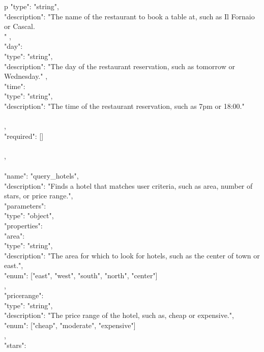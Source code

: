 \begin{table*}
\begin{tabular}{p\linewidth}
{{{{                    "type": "string",\\
                    "description": "The name of the restaurant to book a table at, such as Il Fornaio or Cascal.\\"
		        },\\
                "day": {\\
                    "type": "string",\\
                    "description": "The day of the restaurant reservation, such as tomorrow or Wednesday."
		        },\\
		        "time": {\\
                    "type": "string",\\
                    "description": "The time of the restaurant reservation, such as 7pm or 18:00."\\
		        }\\
            },\\
            "required": []\\
	    }\\
    },\\
    {\\
        "name": "query\_hotels",\\
        "description": "Finds a hotel that matches user criteria, such as area, number of stars, or price range.",\\
        "parameters": {\\
            "type": "object",\\
            "properties": {\\
                "area": {\\
                    "type": "string",\\
                    "description": "The area for which to look for hotels, such as the center of town or east.",\\
                    "enum": ["east", "west", "south", "north", "center"]\\
                },\\
                "pricerange": {\\
                    "type": "string",\\
                    "description": "The price range of the hotel, such as, cheap or expensive.",\\
                    "enum": ["cheap", "moderate", "expensive"]\\
                },\\
                "stars": {\\
}}}}
\end{tabular}
\end{table*}
